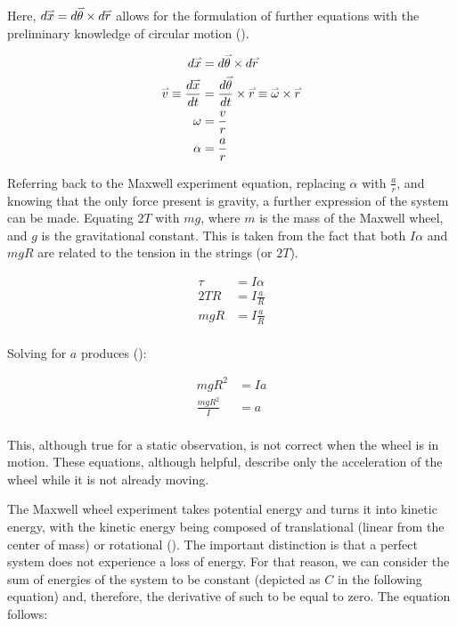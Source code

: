 \documentclass{article}
\newcommand{\myvect}[1]{\accentset{\rightharpoonup}{#1}}
\begin{document}
Here, $d \myvect{x}=d \myvect{\theta} \times d \myvect{r}$ allows for the formulation of further equations with the preliminary knowledge of circular motion (\cite{IBphysics}).

\label{eqn:sangular speed to linear speed}
\begin{align*}
d \myvect{x}&=d \myvect{\theta} \times d \myvect{r} \\
 \myvect{v} \equiv \frac{d \myvect{x}}{d t}&=\frac{d \myvect{\theta}}{d t} \times \myvect{r} \equiv \myvect{\omega} \times \myvect{r} \\
 \omega&=\frac{v}{r} \\
 \alpha&=\frac{a}{r}
\end{align*}

Referring back to the Maxwell experiment equation, replacing $\alpha$ with $\frac{a}{r}$, and knowing that the only force present is gravity, a further expression of the system can be made. Equating $2T$ with $mg$, where $m$ is the mass of the Maxwell wheel, and $g$ is the gravitational constant. This is taken from the fact that both $I \alpha$ and $m g R$ are related to the tension in the strings (or $2T$).

\begin{align*}
 \tau &=I \alpha \\
 2 T R&=I \frac{a}{R} \\
 m g R&=I \frac{a}{R} \\
 \end{align*}

Solving for $a$ produces (\cite{irodovsolutionsmechanics}):

\begin{align*}
 m g R^2&=I a \\
 \frac{m g R^2}{I}&=a\\
\end{align*}

This, although true for a static observation, is not correct when the wheel is in motion. These equations, although helpful, describe only the acceleration of the wheel while it is not already moving. 

The Maxwell wheel experiment takes potential energy and turns it into kinetic energy, with the kinetic energy being composed of translational (linear from the center of mass) or rotational (\cite{Whittaker_1988}). The important distinction is that a perfect system does not experience a loss of energy. For that reason, we can consider the sum of energies of the system to be constant (depicted as $C$ in the following equation) and, therefore, the derivative of such to be equal to zero. The equation follows:
\end{document}

